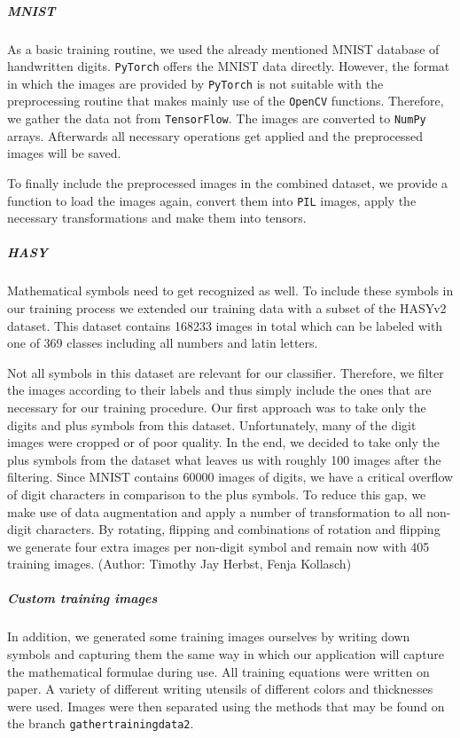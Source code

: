 \documentclass[11pt]{article}
\begin{document}
		\subparagraph{MNIST}
			As a basic training routine, we used the already mentioned MNIST database of handwritten digits. \texttt{PyTorch} offers the MNIST data directly. However, the format in which the images are provided by \texttt{PyTorch} is not suitable with the preprocessing routine that makes mainly use of the \texttt{OpenCV} functions. Therefore, we gather the data not from \texttt{TensorFlow}. The images are converted to \texttt{NumPy} arrays. Afterwards all necessary operations get applied and the preprocessed images will be saved. 
			
			To finally include the preprocessed images in the combined dataset, we provide a function to load the images again, convert them into \texttt{PIL} images, apply the necessary transformations and make them into tensors.
			
		\subparagraph{HASY}
			Mathematical symbols need to get recognized as well. To include these symbols in our training process we extended our training data with a subset of the HASYv2\cite{hasy} dataset. This dataset contains 168233 images in total which can be labeled with one of 369 classes including all numbers and latin letters. 
			
			Not all symbols in this dataset are relevant for our classifier. Therefore, we filter the images according to their labels and thus simply include the ones that are necessary for our training procedure. Our first approach was to take only the digits and plus symbols from this dataset. Unfortunately, many of the digit images were cropped or of poor quality. In the end, we decided to take only the plus symbols from the dataset what leaves us with roughly 100 images after the filtering. Since MNIST contains 60000 images of digits, we have a critical overflow of digit characters in comparison to the plus symbols. To reduce this gap, we make use of data augmentation and apply a number of transformation to all non-digit characters. By rotating, flipping and combinations of rotation and flipping we generate four extra images per non-digit symbol and remain now with 405 training images.
			\newline			\newline
			\indent\small{(Author: Timothy Jay Herbst, Fenja Kollasch)}
			\vspace{-0.5 cm}
		\subparagraph{Custom training images}	
		In addition, we generated some training images ourselves by writing down symbols and capturing them the same way in which our application will capture the mathematical formulae during use.
		All training equations were written on paper.
		A variety of different writing utensils of different colors and thicknesses were used.
		Images were then separated using the methods that may be found on the branch \texttt{gathertrainingdata2}. %
		
\end{document}
